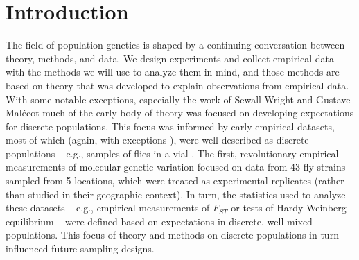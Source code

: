\documentclass{ar-1col}
\begin{document}
\tableofcontents

\section{Introduction}

The field of population genetics is shaped by a continuing conversation
between theory, methods, and data.
We design experiments and collect empirical data
with the methods we will use to analyze them in mind, 
and those methods are based on theory
that was developed to explain observations from empirical data.
With some notable exceptions,
especially the work of Sewall Wright \citep{Wright1940,Wright1943,wright1946isolation}
and Gustave Mal\'ecot \citep{malecot}
much of the early body of theory was focused on
developing expectations for discrete populations.
This focus was informed by early empirical datasets,
most of which
(again, with exceptions \citet[e.g.,][]{Dobzhansky_Wright1943, dobzhansky1947}),
were well-described as discrete populations --
e.g., samples of flies in a vial \citep{lewontin1974}.
The first, revolutionary empirical measurements
of molecular genetic variation \citep{HubbyLewontin66,LewontinHubby66}
focused on data from 43 fly strains sampled from 5 locations,
which were treated as experimental replicates
(rather than studied in their geographic context).
In turn, 
the statistics used to analyze these datasets --
e.g., empirical measurements of $F_{ST}$ \citep{Wright1951}
or tests of Hardy-Weinberg equilibrium \citep{hardy1908,weinberg1908} --
were defined based on expectations in discrete, well-mixed populations.
This focus of theory and methods on discrete populations in turn influenced
future sampling designs.
\end{document}
